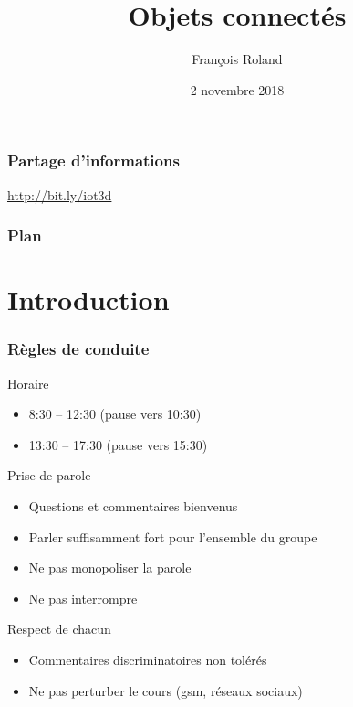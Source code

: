 \documentclass[aspectratio=169,utf8]{beamer}
\title{Objets connectés}
\author{François Roland}
\date{2 novembre 2018}
\begin{document}
\frame{\titlepage}

\begin{frame}
  \frametitle{Partage d'informations}
  \begin{center}
    \url{http://bit.ly/iot3d}
  \end{center}
\end{frame}

\begin{frame}
  \frametitle{Plan}
  \tableofcontents
\end{frame}

\section{Introduction}

\begin{frame}
  \frametitle{Règles de conduite}
  Horaire
  \begin{itemize}
    \item 8:30 -- 12:30 (pause vers 10:30)
    \item 13:30 -- 17:30 (pause vers 15:30)
  \end{itemize}
  Prise de parole
  \begin{itemize}
    \item Questions et commentaires bienvenus 
    \item Parler suffisamment fort pour l'ensemble du groupe
    \item Ne pas monopoliser la parole
    \item Ne pas interrompre
  \end{itemize}
  Respect de chacun
  \begin{itemize}
    \item Commentaires discriminatoires non tolérés
    \item Ne pas perturber le cours (gsm, réseaux sociaux)
  \end{itemize}
\end{frame}
\end{document}
